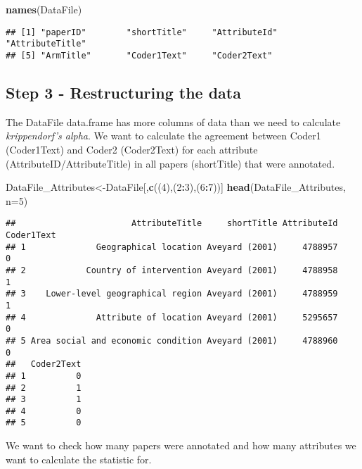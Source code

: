 \documentclass[]{article}
\newenvironment{Shaded}{\begin{snugshade}}{\end{snugshade}}
\newcommand{\KeywordTok}[1]{\textcolor[rgb]{0.13,0.29,0.53}{\textbf{#1}}}
\newcommand{\DataTypeTok}[1]{\textcolor[rgb]{0.13,0.29,0.53}{#1}}
\newcommand{\DecValTok}[1]{\textcolor[rgb]{0.00,0.00,0.81}{#1}}
\newcommand{\OperatorTok}[1]{\textcolor[rgb]{0.81,0.36,0.00}{\textbf{#1}}}
\newcommand{\NormalTok}[1]{#1}
\begin{document}
\begin{Shaded}
\begin{Highlighting}[]
\KeywordTok{names}\NormalTok{(DataFile)}
\end{Highlighting}
\end{Shaded}

\begin{verbatim}
## [1] "paperID"        "shortTitle"     "AttributeId"    "AttributeTitle"
## [5] "ArmTitle"       "Coder1Text"     "Coder2Text"
\end{verbatim}

\subsection{Step 3 - Restructuring the
data}\label{step-3---restructuring-the-data}

The DataFile data.frame has more columns of data than we need to
calculate \emph{krippendorf's alpha}. We want to calculate the agreement
between Coder1 (Coder1Text) and Coder2 (Coder2Text) for each attribute
(AttributeID/AttributeTitle) in all papers (shortTitle) that were
annotated.

\begin{Shaded}
\begin{Highlighting}[]
\NormalTok{DataFile_Attributes<-DataFile[,}\KeywordTok{c}\NormalTok{((}\DecValTok{4}\NormalTok{),(}\DecValTok{2}\OperatorTok{:}\DecValTok{3}\NormalTok{),(}\DecValTok{6}\OperatorTok{:}\DecValTok{7}\NormalTok{))]}
\KeywordTok{head}\NormalTok{(DataFile_Attributes, }\DataTypeTok{n=}\DecValTok{5}\NormalTok{)}
\end{Highlighting}
\end{Shaded}

\begin{verbatim}
##                       AttributeTitle     shortTitle AttributeId Coder1Text
## 1              Geographical location Aveyard (2001)     4788957          0
## 2            Country of intervention Aveyard (2001)     4788958          1
## 3    Lower-level geographical region Aveyard (2001)     4788959          1
## 4              Attribute of location Aveyard (2001)     5295657          0
## 5 Area social and economic condition Aveyard (2001)     4788960          0
##   Coder2Text
## 1          0
## 2          1
## 3          1
## 4          0
## 5          0
\end{verbatim}

We want to check how many papers were annotated and how many attributes
we want to calculate the statistic for.
\end{document}
